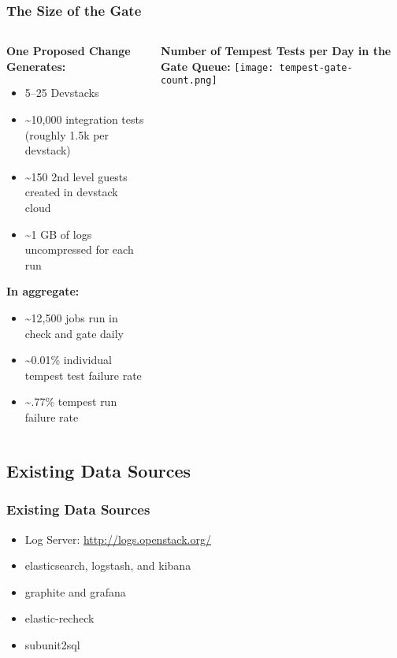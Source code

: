 \documentclass[aspectratio=169,11pt,hyperref={colorlinks=true}]{beamer}
\begin{document}
\begin{frame}
\frametitle{The Size of the Gate}
    \begin{columns}[T]
        \begin{column}{.48\textwidth}
            \textbf{One Proposed Change Generates:}
			\begin{itemize}
				\item 5--25 Devstacks
				\item \textasciitilde10,000 integration tests (roughly 1.5k per devstack)
                \item \textasciitilde150 2nd level guests created in devstack cloud
                \item \textasciitilde1 GB of logs uncompressed for each run
			\end{itemize}
            \textbf{In aggregate:}
            \begin{itemize}
                \item \textasciitilde12,500 jobs run in check and gate daily
                \item \textasciitilde0.01\% individual tempest test failure rate
                \item \textasciitilde.77\% tempest run failure rate
            \end{itemize}
        \end{column}
        \begin{column}{.48\textwidth}
            \centering
            \textbf{Number of Tempest Tests per Day in the Gate Queue:}
            \texttt{[image: tempest-gate-count.png]}
        \end{column}
    \end{columns}
\end{frame}

\subsection{Existing Data Sources}
\begin{frame}
    \frametitle{Existing Data Sources}
    \begin{itemize}
        \item Log Server: \href{http://logs.openstack.org/}{http://logs.openstack.org/}
        \item elasticsearch, logstash, and kibana
        \item graphite and grafana
        \item elastic-recheck
        \item subunit2sql
    \end{itemize}
\end{frame}
\end{document}
